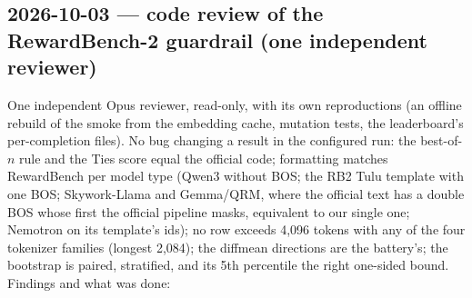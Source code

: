 \documentclass{article}
\begin{document}
\subsection*{2026-10-03 --- code review of the RewardBench-2 guardrail (one independent reviewer)}
One independent Opus reviewer, read-only, with its own reproductions (an offline rebuild of the smoke from the
embedding cache, mutation tests, the leaderboard's per-completion files). No bug changing a result in the configured
run: the best-of-$n$ rule and the Ties score equal the official code; formatting matches RewardBench per model type
(Qwen3 without BOS; the RB2 Tulu template with one BOS; Skywork-Llama and Gemma/QRM, where the official text has a
double BOS whose first the official pipeline masks, equivalent to our single one; Nemotron on its template's ids); no
row exceeds 4{,}096 tokens with any of the four tokenizer families (longest 2{,}084); the diffmean directions are the
battery's; the bootstrap is paired, stratified, and its 5th percentile the right one-sided bound. Findings and what was
done:
\end{document}
